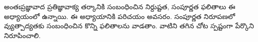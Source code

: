 \documentclass[../../../include/open-logic-chapter]{subfiles}
\begin{document}

\begin{editorial}
  అంతఃప్రజ్ఞావాద ప్రతిజ్ఞావాక్య తర్కానికి సంబంధించిన
  నిర్దుష్టత, సంపూర్ణత ఫలితాలు ఈ అధ్యాయంలో ఉన్నాయి.
  ఈ అధ్యాయానికి పరిచయం అవసరం. సంపూర్ణత నిరూపణలో
  వ్యుత్పాద్యతకు సంబంధించిన కొన్ని ఫలితాలను వాడతాం.
  వాటిని తగిన చోట స్పష్టంగా పేర్కొని నిరూపించాలి.
\end{editorial}


\OLEndChapterHook
\end{document}
